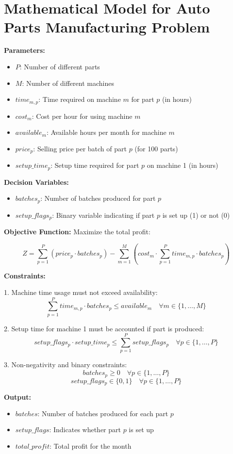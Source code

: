 \documentclass{article}
\begin{document}
\section*{Mathematical Model for Auto Parts Manufacturing Problem}

\textbf{Parameters:}
\begin{itemize}
    \item $P$: Number of different parts
    \item $M$: Number of different machines
    \item $time_{m,p}$: Time required on machine $m$ for part $p$ (in hours)
    \item $cost_{m}$: Cost per hour for using machine $m$
    \item $available_{m}$: Available hours per month for machine $m$
    \item $price_{p}$: Selling price per batch of part $p$ (for 100 parts)
    \item $setup\_time_{p}$: Setup time required for part $p$ on machine 1 (in hours)
\end{itemize}

\textbf{Decision Variables:}
\begin{itemize}
    \item $batches_{p}$: Number of batches produced for part $p$
    \item $setup\_flags_{p}$: Binary variable indicating if part $p$ is set up (1) or not (0)
\end{itemize}

\textbf{Objective Function:}
Maximize the total profit:

\[
Z = \sum_{p=1}^{P} (price_{p} \cdot batches_{p}) - \sum_{m=1}^{M} (cost_{m} \cdot \sum_{p=1}^{P} time_{m,p} \cdot batches_{p})
\]

\textbf{Constraints:}

1. Machine time usage must not exceed availability:
\[
\sum_{p=1}^{P} time_{m,p} \cdot batches_{p} \leq available_{m} \quad \forall m \in \{1, \ldots, M\}
\]

2. Setup time for machine 1 must be accounted if part is produced:
\[
setup\_flags_{p} \cdot setup\_time_{p} \leq \sum_{p=1}^{P} setup\_flags_{p} \quad \forall p \in \{1, \ldots, P\}
\]

3. Non-negativity and binary constraints:
\[
batches_{p} \geq 0 \quad \forall p \in \{1, \ldots, P\}
\]
\[
setup\_flags_{p} \in \{0, 1\} \quad \forall p \in \{1, \ldots, P\}
\]

\textbf{Output:}
\begin{itemize}
    \item $batches$: Number of batches produced for each part $p$
    \item $setup\_flags$: Indicates whether part $p$ is set up
    \item $total\_profit$: Total profit for the month
\end{itemize}
\end{document}
